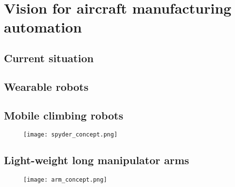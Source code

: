 \chapter{Vision for aircraft manufacturing automation}
\label{sec:VisionForAircraftManufacturingAutomation}



\section{Current situation}
\label{sec:CurrentSituation}


\section{Wearable robots}
\label{sec:WearableRobots}


\section{Mobile climbing robots}
\label{sec:MobileClimbingRobots}


\begin{figure}[H]
	\centering
		\texttt{[image: spyder\_concept.png]}
	\label{fig:arm_concept}
\end{figure}



\section{Light-weight long manipulator arms}
\label{sec:LightWeightLongManipulatorArm}


\begin{figure}[H]
	\centering
		\texttt{[image: arm\_concept.png]}
	\label{fig:arm_concept}
\end{figure}